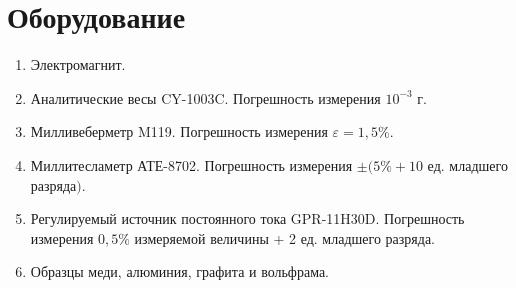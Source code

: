 \section*{Оборудование}

\begin{enumerate}
	\item Электромагнит.
	
	\item Аналитические весы CY-1003C. Погрешность измерения $10^{-3}$ г.
	
	\item Милливеберметр M119. Погрешность измерения $\varepsilon = 1,5\%$.
	
	\item Миллитесламетр АТЕ-8702. Погрешность измерения $\pm(5\% + 10$ ед. младшего разряда$)$.
	
	\item Регулируемый источник постоянного тока GPR-11H30D. Погрешность измерения $0,5\%$ измеряемой величины + 2 ед. младшего разряда.
	
	\item Образцы меди, алюминия, графита и вольфрама.
\end{enumerate}